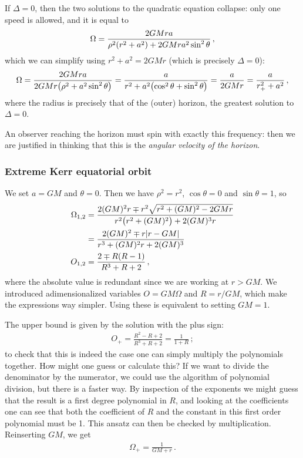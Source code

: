 \documentclass[main.tex]{subfiles}
\begin{document}
If \(\Delta = 0\), then the two solutions to the quadratic equation collapse: only one speed is allowed, and it is equal to 
%
\begin{align}
\Omega = \frac{2GMra}{\rho^2 \qty(r^2+a^2) + 2GMr a^2 \sin^2\theta }
\,,
\end{align}
%
which we can simplify using \(r^2+a^2 = 2GMr\) (which is  precisely \(\Delta = 0\)): 
%
\begin{align}
\Omega = \frac{2GMra}{2GMr \qty( \rho^2 + a^2 \sin^2 \theta )} = \frac{a}{r^2 + a^2 \qty(\cos^2\theta +\sin^2\theta )} = \frac{a}{2GMr} = \frac{a}{r_{+}^2 + a^2}
\,,
\end{align}
%
where the radius is precisely that of the (outer) horizon, the greatest solution  to \(\Delta = 0\). 

An observer reaching the horizon must spin with exactly this frequency: then we are justified in thinking that this is the \emph{angular velocity of the horizon}. 

\subsubsection{Extreme Kerr equatorial orbit}

We set \(a = GM\) and \(\theta  = 0\). Then we have \(\rho^2= r^2\), \(\cos \theta = 0\) and \(\sin \theta =1\), so
%
\begin{align}
\Omega_{1, 2} &= \frac{2 (GM)^2 r \mp r^2\sqrt{r^2 + (GM)^2 - 2GMr}}{r^2 \qty(r^2 +(GM)^2) + 2 (GM)^3 r}  \\
&= \frac{2 (GM)^2 \mp r \abs{r - GM}}{r^3+(GM)^2r + 2 (GM)^3} \\
O_{1,2}&= \frac{2 \mp R (R-1)}{R^3+R + 2}
\,,
\end{align}
%
where the absolute value is redundant since we are working at \(r > GM\).
We introduced adimensionalized variables \(O = GM \Omega \) and \(R = r/GM\), which make the expressions way simpler. Using these is equivalent to setting \(GM = 1\). 

The upper bound is given by the solution with the plus sign: 
%
\begin{align}
O_{+} = \frac{R^2 - R + 2}{R^3+ R  + 2} = \frac{1}{1 + R}
\,;
\end{align}
%
to check that this is indeed the case one can simply multiply the polynomials together. 
How might one guess or calculate this? If we want to divide the denominator by the numerator, we could use the algorithm of polynomial division, but there is a faster way. By inspection of the exponents we might guess that the result is a first degree polynomial in \(R\), and looking at the coefficients one can see that both the coefficient of \(R\) and the constant in this first order polynomial must be 1. This ansatz can then be checked by multiplication. Reinserting \(GM\), we get 
%
\begin{align}
\Omega_{+} = \frac{1}{GM + r}
\,.
\end{align}
%
\end{document}

